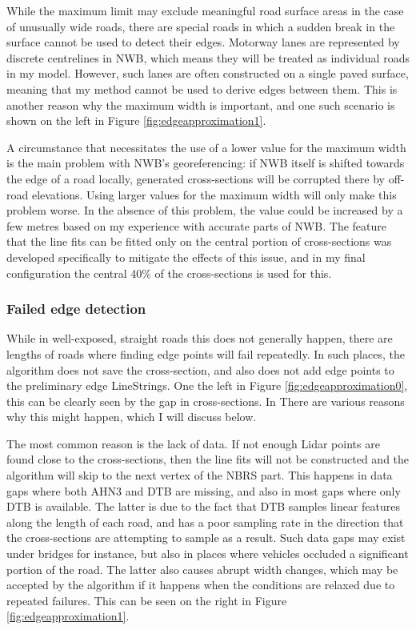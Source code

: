 While the maximum limit may exclude meaningful road surface areas in the case of unusually wide roads, there are special roads in which a sudden break in the surface cannot be used to detect their edges. Motorway lanes are represented by discrete centrelines in NWB, which means they will be treated as individual roads in my model. However, such lanes are often constructed on a single paved surface, meaning that my method cannot be used to derive edges between them. This is another reason why the maximum width is important, and one such scenario is shown on the left in Figure \ref{fig:edgeapproximation1}.

A circumstance that necessitates the use of a lower value for the maximum width is the main problem with NWB's georeferencing: if NWB itself is shifted towards the edge of a road locally, generated cross-sections will be corrupted there by off-road elevations. Using larger values for the maximum width will only make this problem worse. In the absence of this problem, the value could be increased by a few metres based on my experience with accurate parts of NWB. The feature that the line fits can be fitted only on the central portion of cross-sections was developed specifically to mitigate the effects of this issue, and in my final configuration the central 40\% of the cross-sections is used for this.

\subsubsection{Failed edge detection}

While in well-exposed, straight roads this does not generally happen, there are lengths of roads where finding edge points will fail repeatedly. In such places, the algorithm does not save the cross-section, and also does not add edge points to the preliminary edge LineStrings. One the left in Figure \ref{fig:edgeapproximation0}, this can be clearly seen by the gap in cross-sections. In There are various reasons why this might happen, which I will discuss below.

The most common reason is the lack of data. If not enough Lidar points are found close to the cross-sections, then the line fits will not be constructed and the algorithm will skip to the next vertex of the NBRS part. This happens in data gaps where both AHN3 and DTB are missing, and also in most gaps where only DTB is available. The latter is due to the fact that DTB samples linear features along the length of each road, and has a poor sampling rate in the direction that the cross-sections are attempting to sample as a result. Such data gaps may exist under bridges for instance, but also in places where vehicles occluded a significant portion of the road. The latter also causes abrupt width changes, which may be accepted by the algorithm if it happens when the conditions are relaxed due to repeated failures. This can be seen on the right in Figure \ref{fig:edgeapproximation1}.

